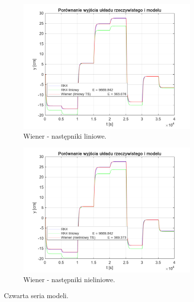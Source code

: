 \begin{figure}[b!]
\begin{subfigure}[b]{0.49\paperwidth}
\centering
\includegraphics[width=\linewidth]{pictures/WienerLinearModel_4}
\caption{Wiener - następniki liniowe.}
\end{subfigure}
\hfill
\begin{subfigure}[b]{0.49\paperwidth}
\centering
\includegraphics[width=\linewidth]{pictures/WienerNonlinearModel_4}
\caption{Wiener - następniki nieliniowe.}
\end{subfigure}

\caption{Czwarta seria modeli.}
\end{figure}

\newpage

